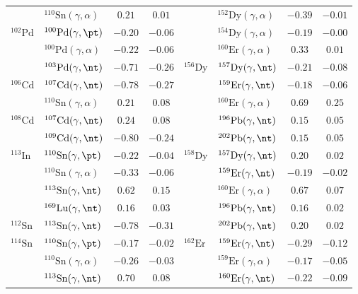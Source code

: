 {\begin{longtable}{llcc llcc}
$ $ & $^{110}\mathrm{Sn}(\gamma,\alpha)$ & $0.21$ & $0.01$ & $ $ & $^{152}\mathrm{Dy}(\gamma,\alpha)$ & $-0.39$ & $-0.01$ \\ 
$^{102}\mathrm{Pd}$ & $^{100}\mathrm{Pd}(\gamma,\pt)$ & $-0.20$ & $-0.06$ & $ $ & $^{154}\mathrm{Dy}(\gamma,\alpha)$ & $-0.19$ & $-0.00$ \\ 
$ $ & $^{100}\mathrm{Pd}(\gamma,\alpha)$ & $-0.22$ & $-0.06$ & $ $ & $^{160}\mathrm{Er}(\gamma,\alpha)$ & $0.33$ & $0.01$ \\ 
$ $ & $^{103}\mathrm{Pd}(\gamma,\nt)$ & $-0.71$ & $-0.26$ & $^{156}\mathrm{Dy}$ & $^{157}\mathrm{Dy}(\gamma,\nt)$ & $-0.21$ & $-0.08$ \\ 
$^{106}\mathrm{Cd}$ & $^{107}\mathrm{Cd}(\gamma,\nt)$ & $-0.78$ & $-0.27$ & $ $ & $^{159}\mathrm{Er}(\gamma,\nt)$ & $-0.18$ & $-0.06$ \\ 
$ $ & $^{110}\mathrm{Sn}(\gamma,\alpha)$ & $0.21$ & $0.08$ & $ $ & $^{160}\mathrm{Er}(\gamma,\alpha)$ & $0.69$ & $0.25$ \\ 
$^{108}\mathrm{Cd}$ & $^{107}\mathrm{Cd}(\gamma,\nt)$ & $0.24$ & $0.08$ & $ $ & $^{196}\mathrm{Pb}(\gamma,\nt)$ & $0.15$ & $0.05$ \\ 
$ $ & $^{109}\mathrm{Cd}(\gamma,\nt)$ & $-0.80$ & $-0.24$ & $ $ & $^{202}\mathrm{Pb}(\gamma,\nt)$ & $0.15$ & $0.05$ \\ 
$^{113}\mathrm{In}$ & $^{110}\mathrm{Sn}(\gamma,\pt)$ & $-0.22$ & $-0.04$ & $^{158}\mathrm{Dy}$ & $^{157}\mathrm{Dy}(\gamma,\nt)$ & $0.20$ & $0.02$ \\ 
$ $ & $^{110}\mathrm{Sn}(\gamma,\alpha)$ & $-0.33$ & $-0.06$ & $ $ & $^{159}\mathrm{Er}(\gamma,\nt)$ & $-0.19$ & $-0.02$ \\ 
$ $ & $^{113}\mathrm{Sn}(\gamma,\nt)$ & $0.62$ & $0.15$ & $ $ & $^{160}\mathrm{Er}(\gamma,\alpha)$ & $0.67$ & $0.07$ \\ 
$ $ & $^{169}\mathrm{Lu}(\gamma,\nt)$ & $0.16$ & $0.03$ & $ $ & $^{196}\mathrm{Pb}(\gamma,\nt)$ & $0.16$ & $0.02$ \\ 
$^{112}\mathrm{Sn}$ & $^{113}\mathrm{Sn}(\gamma,\nt)$ & $-0.78$ & $-0.31$ & $ $ & $^{202}\mathrm{Pb}(\gamma,\nt)$ & $0.20$ & $0.02$ \\ 
$^{114}\mathrm{Sn}$ & $^{110}\mathrm{Sn}(\gamma,\pt)$ & $-0.17$ & $-0.02$ & $^{162}\mathrm{Er}$ & $^{159}\mathrm{Er}(\gamma,\nt)$ & $-0.29$ & $-0.12$ \\ 
$ $ & $^{110}\mathrm{Sn}(\gamma,\alpha)$ & $-0.26$ & $-0.03$ & $ $ & $^{159}\mathrm{Er}(\gamma,\alpha)$ & $-0.17$ & $-0.05$ \\ 
$ $ & $^{113}\mathrm{Sn}(\gamma,\nt)$ & $0.70$ & $0.08$ & $ $ & $^{160}\mathrm{Er}(\gamma,\nt)$ & $-0.22$ & $-0.09$ \\ 

\end{longtable}}
